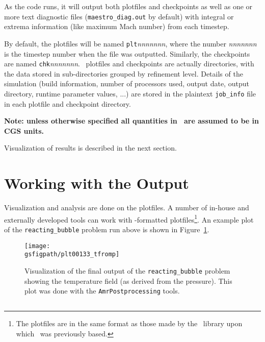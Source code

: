 \begin{enumerate}
  As the code runs, it will output both plotfiles and checkpoints as
  well as one or more text diagnostic files ({\tt maestro\_diag.out}
  by default) with integral or extrema information (like maximum Mach
  number) from each timestep.

  By default, the plotfiles will be named {\tt plt}{\em nnnnnnn}, where
  the number {\em nnnnnnn} is the timestep number when the file was
  outputted.  Similarly, the checkpoints are named
  {\tt chk}{\em nnnnnnn}.  \amrex\ plotfiles and checkpoints are actually
  directories, with the data stored in sub-directories grouped by
  refinement level.  Details of the simulation (build information,
  number of processors used, output date, output directory, runtime
  parameter values, ...)  are stored in the plaintext {\tt job\_info}
  file in each plotfile and checkpoint directory.

  {\bf Note: unless otherwise specified all quantities in
    \maestroex\ are assumed to be in CGS units.}

  Visualization of results is described in the next section.


\end{enumerate}


\section{Working with the Output}

Visualization and analysis are done on the plotfiles.  A number of
in-house and externally developed tools can work with \amrex-formatted
plotfiles\footnote{The plotfiles are in the same format as those made
  by the \boxlib\ library upon which \maestroex\ was previously based.}.
An example plot of the {\tt reacting\_bubble} problem run above is
shown in Figure~\ref{fig:gettingstarted:test2}.

\begin{figure}[t]
\centering
\texttt{[image: \\gsfigpath/plt00133\_tfromp]}
\caption[Visualization of {\tt reacting\_bubble} output]{\label{fig:gettingstarted:test2} Visualization of the
final output of the {\tt reacting\_bubble} problem showing the temperature
field (as derived from the pressure).  This plot was done with
the {\tt AmrPostprocessing} tools.}
\end{figure}



\subsection{\amrvis}


